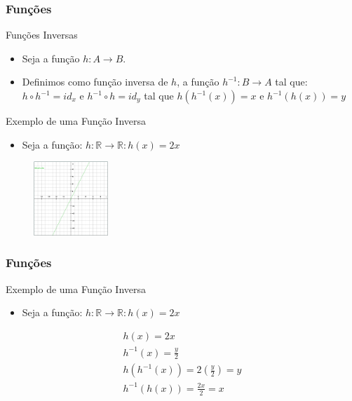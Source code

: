 \documentclass{beamer}
\begin{document}
\begin{frame}
\frametitle{Funções}

	\begin{block}{Funções Inversas}
		\begin{itemize}
			\item Seja a função $h : A \to B$.
			\item Definimos como função inversa de $h$, a função $h^{-1}: B \to A$ tal que: $ h \circ h^{-1} = id_x$ e $ h^{-1} \circ h = id_y$ tal que  $h(h^{-1}(x)) = x$ e $h^{-1}(h(x)) = y$
		\end{itemize}
	\end{block}
	
	\begin{block}{Exemplo de uma Função Inversa}
		\begin{itemize}
			\item Seja a função: $h: \mathbb{R} \to \mathbb{R} : h(x) = 2x$
		\end{itemize}
	\end{block}
	\begin{figure}[!h]
			\begin{center}
			\includegraphics[width=0.25\textwidth]{Figures/h}
			\end{center}
	\end{figure}	
	
\end{frame}


\begin{frame}
\frametitle{Funções}

	\begin{block}{Exemplo de uma Função Inversa}
		\begin{itemize}
			\item Seja a função: $h: \mathbb{R} \to \mathbb{R} : h(x) = 2x$
		\end{itemize}
	\end{block}
		\begin{eqnarray}
			h(x) = 2x \\
			h^{-1}(x) = \frac{y}{2} \\
			h(h^{-1}(x)) = 2(\frac{y}{2}) = y \\
			h^{-1}(h(x)) = \frac{2x}{2} = x
		\end{eqnarray}

\end{frame}







\end{document}
